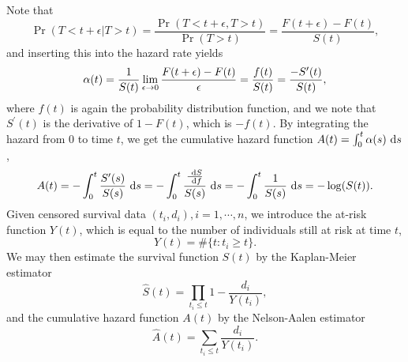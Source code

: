 Note that
\begin{equation*}
    \Pr(T<t+\epsilon|T>t)=\frac{\Pr(T<t+\epsilon,T>t)}{\Pr(T>t)}=\frac{F(t+\epsilon)-F(t)}{S(t)},
\end{equation*}
and inserting this into the hazard rate yields
\begin{equation*}
    \alpha(t)=\frac{1}{S(t)}\lim_{\epsilon\to0}\frac{F(t+\epsilon)-F(t)}{\epsilon}=\frac{f(t)}{S(t)}=\frac{-S^\prime(t)}{S(t)},
\end{equation*}
where $f(t)$ is again the probability distribution function, and we note that $S^\prime(t)$ is the derivative of $1-F(t)$, which is $-f(t)$. By integrating the hazard from 0 to time $t$, we get the cumulative hazard function $A(t)=\int_0^t\alpha(s)~\text{d} s$,
\begin{equation*}
    A(t)=-\int_0^t\frac{S^\prime(s)}{S(s)}~\text{d} s=-\int_0^t\frac{\frac{~\text{d} S}{~\text{d} f}}{S(s)}~\text{d} s=-\int_0^t\frac{1}{S(s)}~\text{d} s=-\log(S(t)).
\end{equation*}
Given censored survival data $(t_i,d_i),i=1,\cdots,n$, we introduce the at-risk function $Y(t)$, which is equal to the number of individuals still at risk at time $t$,
\begin{equation*}
    Y(t)=\#\{t\colon t_i\geq t\}.
\end{equation*}
We may then estimate the survival function $S(t)$ by the Kaplan-Meier estimator
\begin{equation*}
    \hat{S}(t)=\prod_{t_i\leq t}1-\frac{d_i}{Y(t_i)},
\end{equation*}
and the cumulative hazard function $A(t)$ by the Nelson-Aalen estimator
\begin{equation*}
    \hat{A}(t)=\sum_{t_i\leq t}\frac{d_i}{Y(t_i)}.
\end{equation*}

